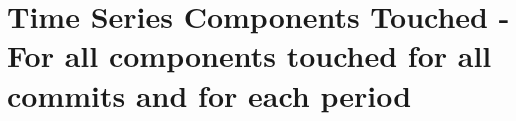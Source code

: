 \section{Time Series Components Touched - For all components touched for all commits and for each period } 




